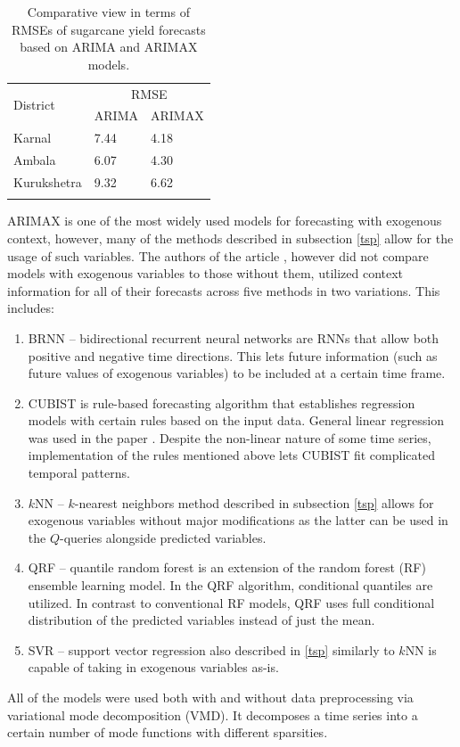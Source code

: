 \documentclass[3p,times,procedia]{elsarticle}
\begin{document}
\begin{table}[h]
\caption{Comparative view in terms of RMSEs of sugarcane yield forecasts based on ARIMA and ARIMAX models.}
\label{tab:t3}
\begin{tabular*}{\hsize}{@{\extracolsep{\fill}}lll@{}}
\toprule
\multirow{2}{*}{District} & \multicolumn{2}{c}{RMSE} \\
 & ARIMA & ARIMAX \\
\colrule
Karnal & 7.44 & 4.18 \\
Ambala & 6.07 & 4.30 \\
Kurukshetra & 9.32 & 6.62 \\
\botrule
\end{tabular*}
\end{table}

ARIMAX is one of the most widely used models for forecasting with exogenous context, however, many of the methods described in subsection \ref{tsp} allow for the usage of such variables. The authors of the article \cite{da2020forecasting}, however did not compare models with exogenous variables to those without them, utilized context information for all of their forecasts across five methods in two variations. This includes:
\begin{enumerate}
	\item BRNN -- bidirectional recurrent neural networks are RNNs that allow both positive and negative time directions. This lets future information (such as future values of exogenous variables) to be included at a certain time frame.
	\item CUBIST is rule-based forecasting algorithm that establishes regression models with certain rules based on the input data. General linear regression was used in the paper \cite{da2020forecasting}. Despite the non-linear nature of some time series, implementation of the rules mentioned above lets CUBIST fit complicated temporal patterns.
	\item $k$NN -- $k$-nearest neighbors method described in subsection \ref{tsp} allows for exogenous variables without major modifications as the latter can be used in the $Q$-queries alongside predicted variables.
	\item QRF -- quantile random forest is an extension of the random forest (RF) ensemble learning model. In the QRF algorithm, conditional quantiles are utilized. In contrast to conventional RF models, QRF uses full conditional distribution of the predicted variables instead of just the mean.
	\item SVR -- support vector regression also described in \ref{tsp} similarly to $k$NN is capable of taking in exogenous variables as-is.
\end{enumerate}
All of the models were used both with and without data preprocessing via variational mode decomposition (VMD). It decomposes a time series into a certain number of mode functions with different sparsities.
\end{document}
